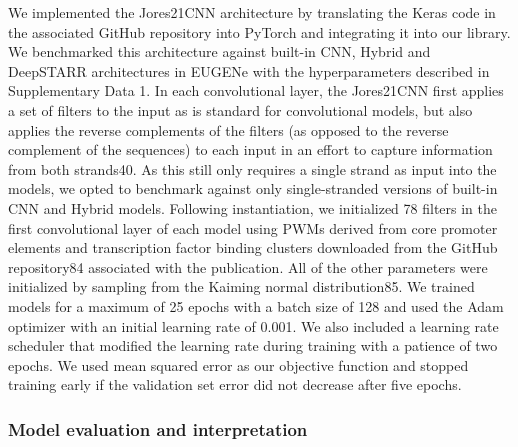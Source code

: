 We implemented the Jores21CNN architecture by translating the Keras code in the associated GitHub repository into PyTorch and integrating it into our library. We benchmarked this architecture against built-in CNN, Hybrid and DeepSTARR architectures in EUGENe with the hyperparameters described in Supplementary Data 1. In each convolutional layer, the Jores21CNN first applies a set of filters to the input as is standard for convolutional models, but also applies the reverse complements of the filters (as opposed to the reverse complement of the sequences) to each input in an effort to capture information from both strands40. As this still only requires a single strand as input into the models, we opted to benchmark against only single-stranded versions of built-in CNN and Hybrid models. Following instantiation, we initialized 78 filters in the first convolutional layer of each model using PWMs derived from core promoter elements and transcription factor binding clusters downloaded from the GitHub repository84 associated with the publication. All of the other parameters were initialized by sampling from the Kaiming normal distribution85. We trained models for a maximum of 25 epochs with a batch size of 128 and used the Adam optimizer with an initial learning rate of 0.001. We also included a learning rate scheduler that modified the learning rate during training with a patience of two epochs. We used mean squared error as our objective function and stopped training early if the validation set error did not decrease after five epochs.

\subsubsection{Model evaluation and interpretation}

